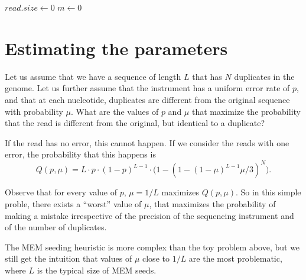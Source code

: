 \documentclass{article}
\begin{document}
\begin{algorithm}[H]
\SetAlgoLined
{}
  $read.size \leftarrow 0$\;
  $m \leftarrow 0$ 
\end{algorithm}

\section{Estimating the parameters}

Let us assume that we have a sequence of length $L$ that has $N$
duplicates in the genome. Let us further assume that the instrument has a
uniform error rate of $p$, and that at each nucleotide, duplicates are
different from the original sequence with probability $\mu$. What are the
values of $p$ and $\mu$ that maximize the probability that the read is
different from the original, but identical to a duplicate?

If the read has no error, this cannot happen. If we consider the reads
with one error, the probability that this happens is
\begin{equation}
Q(p,\mu) = L \cdot p \cdot (1-p)^{L-1}
\cdot \Big( 1- (1-(1-\mu)^{L-1} \mu/3)^N \Big).
\end{equation}

Observe that for every value of $p$, $\mu = 1/L$ maximizes $Q(p,\mu)$. So
in this simple proble, there exists a ``worst'' value of $\mu$, that
maximizes the probability of making a mistake irrespective of the
precision of the sequencing instrument and of the number of duplicates.

The MEM seeding heuristic is more complex than the toy problem above, but
we still get the intuition that values of $\mu$ close to $1/L$ are the
most problematic, where $L$ is the typical size of MEM seeds.
\end{document}
